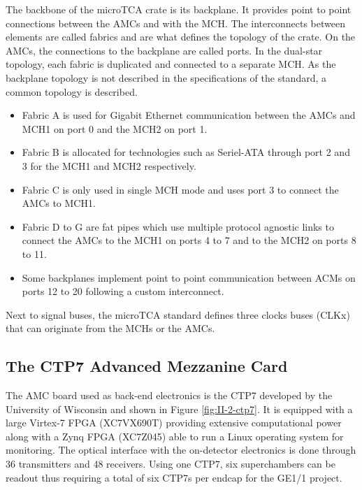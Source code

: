       The backbone of the microTCA crate is its backplane. It provides point to point connections between the AMCs and with the MCH. The interconnects between elements are called fabrics and are what defines the topology of the crate. On the AMCs, the connections to the backplane are called ports. In the dual-star topology, each fabric is duplicated and connected to a separate MCH. As the backplane topology is not described in the specifications of the standard, a common topology is described.
      \begin{itemize}
        \item Fabric A is used for Gigabit Ethernet communication between the AMCs and MCH1 on port 0 and the MCH2 on port 1.
        \item Fabric B is allocated for technologies such as Seriel-ATA through port 2 and 3 for the MCH1 and MCH2 respectively.
        \item Fabric C is only used in single MCH mode and uses port 3 to connect the AMCs to MCH1.
        \item Fabric D to G are fat pipes which use multiple protocol agnostic links to connect the AMCs to the MCH1 on ports 4 to 7 and to the MCH2 on ports 8 to 11.
        \item Some backplanes implement point to point communication between ACMs on ports 12 to 20 following a custom interconnect.
      \end{itemize}
      Next to signal buses, the microTCA standard defines three clocks buses (CLKx) that can originate from the MCHs or the AMCs.

    \subsection{The CTP7 Advanced Mezzanine Card}

      The AMC board used as back-end electronics is the CTP7 \cite{CTP7} developed by the University of Wisconsin and shown in Figure \ref{fig:II-2-ctp7}. It is equipped with a large Virtex-7 FPGA (XC7VX690T) providing extensive computational power along with a Zynq FPGA (XC7Z045) able to run a Linux operating system for monitoring. The optical interface with the on-detector electronics is done through 36 transmitters and 48 receivers. Using one CTP7, six superchambers can be readout thus requiring a total of six CTP7s per endcap for the GE1/1 project. \\

